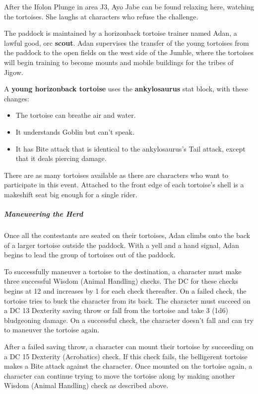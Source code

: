 \documentclass[10pt,a4paper,twoside,fancy,bg=print,twocolumn,openany,nodeprecatedcode]{dndbook}
\begin{document}
After the Ifolon Plunge in area J3, Ayo Jabe can be found relaxing here, watching the tortoises. She laughs at characters who refuse the challenge.

The paddock is maintained by a horizonback tortoise trainer named Adan, a lawful good, orc \textbf{scout}. Adan supervises the transfer of the young tortoises from the paddock to the open fields on the west side of the Jumble, where the tortoises will begin training to become mounts and mobile buildings for the tribes of Jigow.

A \textbf{young horizonback tortoise} uses the \textbf{ankylosaurus} stat block, with these changes:


\begin{itemize}
\item The tortoise can breathe air and water.
\item It understands Goblin but can't speak.
\item It has Bite attack that is identical to the ankylosaurus's Tail attack, except that it deals piercing damage.
\end{itemize}

There are as many tortoises available as there are characters who want to participate in this event. Attached to the front edge of each tortoise's shell is a makeshift seat big enough for a single rider.

\subparagraph{Maneuvering the Herd}
Once all the contestants are seated on their tortoises, Adan climbs onto the back of a larger tortoise outside the paddock. With a yell and a hand signal, Adan begins to lead the group of tortoises out of the paddock.

To successfully maneuver a tortoise to the destination, a character must make three successful Wisdom (Animal Handling) checks. The DC for these checks begins at 12 and increases by 1 for each check thereafter. On a failed check, the tortoise tries to buck the character from its back. The character must succeed on a DC 13 Dexterity saving throw or fall from the tortoise and take 3 (1d6) bludgeoning damage. On a successful check, the character doesn't fall and can try to maneuver the tortoise again.

After a failed saving throw, a character can mount their tortoise by succeeding on a DC 15 Dexterity (Acrobatics) check. If this check fails, the belligerent tortoise makes a Bite attack against the character. Once mounted on the tortoise again, a character can continue trying to move the tortoise along by making another Wisdom (Animal Handling) check as described above.
\end{document}

